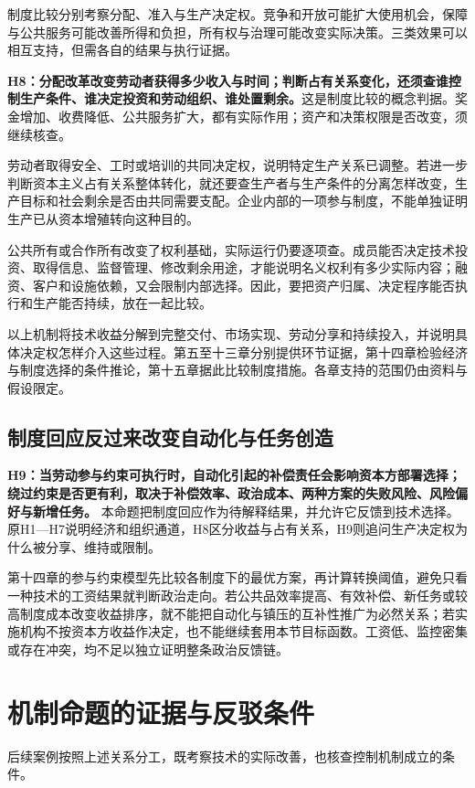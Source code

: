 \documentclass[UTF8,fontset=windows,12pt,a4paper,oneside,openany]{ctexbook}
\begin{document}
制度比较分别考察分配、准入与生产决定权。竞争和开放可能扩大使用机会，保障与公共服务可能改善所得和负担，所有权与治理可能改变实际决策。三类效果可以相互支持，但需各自的结果与执行证据。

\textbf{H8：分配改革改变劳动者获得多少收入与时间；判断占有关系变化，还须查谁控制生产条件、谁决定投资和劳动组织、谁处置剩余。}这是制度比较的概念判据。奖金增加、收费降低、公共服务扩大，都有实际作用；资产和决策权限是否改变，须继续核查。

劳动者取得安全、工时或培训的共同决定权，说明特定生产关系已调整。若进一步判断资本主义占有关系整体转化，就还要查生产者与生产条件的分离怎样改变，生产目标和社会剩余是否由共同需要支配。企业内部的一项参与制度，不能单独证明生产已从资本增殖转向这种目的。

公共所有或合作所有改变了权利基础，实际运行仍要逐项查。成员能否决定技术投资、取得信息、监督管理、修改剩余用途，才能说明名义权利有多少实际内容；融资、客户和设施依赖，又会限制内部选择。因此，要把资产归属、决定程序能否执行和生产能否持续，放在一起比较。

以上机制将技术收益分解到完整交付、市场实现、劳动分享和持续投入，并说明具体决定权怎样介入这些过程。第五至十三章分别提供环节证据，第十四章检验经济与制度选择的条件推论，第十五章据此比较制度措施。各章支持的范围仍由资料与假设限定。

\subsection{制度回应反过来改变自动化与任务创造}

\textbf{H9：当劳动参与约束可执行时，自动化引起的补偿责任会影响资本方部署选择；绕过约束是否更有利，取决于补偿效率、政治成本、两种方案的失败风险、风险偏好与新增任务。} 本命题把制度回应作为待解释结果，并允许它反馈到技术选择。原H1—H7说明经济和组织通道，H8区分收益与占有关系，H9则追问生产决定权为什么被分享、维持或限制。

第十四章的参与约束模型先比较各制度下的最优方案，再计算转换阈值，避免只看一种技术的工资结果就判断政治走向。若公共品效率提高、有效补偿、新任务或较高制度成本改变收益排序，就不能把自动化与镇压的互补性推广为必然关系；若实施机构不按资本方收益作决定，也不能继续套用本节目标函数。工资低、监控密集或存在冲突，均不足以独立证明整条政治反馈链。

\section{机制命题的证据与反驳条件}

后续案例按照上述关系分工，既考察技术的实际改善，也核查控制机制成立的条件。
\end{document}
